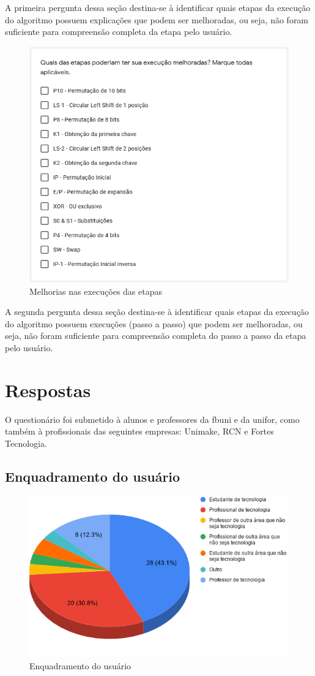 A primeira pergunta dessa seção destina-se à identificar quais etapas da execução do algoritmo possuem explicações que podem ser melhoradas, ou seja, não foram suficiente para compreensão completa da etapa pelo usuário.

\begin{figure}[H]
    \centering
    \caption{Melhorias nas execuções das etapas}
    \includegraphics[width=0.7\linewidth]{Questionario/Q6.png}
\end{figure}

A segunda pergunta dessa seção destina-se à identificar quais etapas da execução do algoritmo possuem execuções (passo a passo) que podem ser melhoradas, ou seja, não foram suficiente para compreensão completa do passo a passo da etapa pelo usuário.

\section{Respostas}

O questionário foi submetido à alunos e professores da \acrshort{fbuni} e da \acrshort{unifor}, como também à profissionais das seguintes empresas: Unimake, RCN e Fortes Tecnologia.

\subsection{Enquadramento do usuário}

\begin{figure}[H]
    \centering
    \caption{Enquadramento do usuário}
    \includegraphics[width=.65\linewidth]{Questionario/CQ1.png}
\end{figure}

